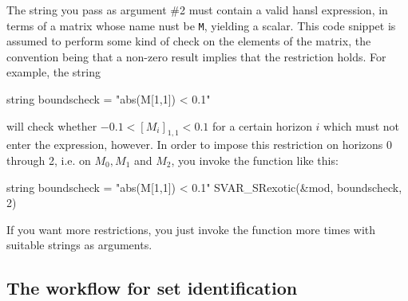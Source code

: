 \documentclass[a4paper,10pt]{article}
\begin{document}
The string you pass as argument \#2 must contain a valid hansl
expression, in terms of a matrix whose name nust be \texttt{M},
yielding a scalar. This code snippet is assumed to perform some kind
of check on the elements of the matrix, the convention being that a
non-zero result implies that the restriction holds. For example, the
string
\begin{code}
string boundscheck = "abs(M[1,1]) < 0.1"
\end{code}
will check whether $-0.1 < [M_i]_{1,1} < 0.1$ for a certain horizon $i$
which must not enter the expression, however. In order to impose
this restriction on horizons 0 through 2, i.e. on $M_0, M_1$ and $M_2$,
you invoke the function like this:
\begin{code}
string boundscheck = "abs(M[1,1]) < 0.1"
SVAR_SRexotic(&mod, boundscheck, 2)
\end{code}

If you want more restrictions, you just invoke the function more times
with suitable strings as arguments.


\subsection{The workflow for set identification}
\end{document}
